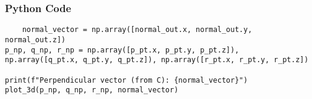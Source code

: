 \documentclass{beamer}
\begin{document}
    \begin{frame}[fragile]
        \frametitle{Python Code}
        \begin{lstlisting}
    normal_vector = np.array([normal_out.x, normal_out.y, normal_out.z])
p_np, q_np, r_np = np.array([p_pt.x, p_pt.y, p_pt.z]), np.array([q_pt.x, q_pt.y, q_pt.z]), np.array([r_pt.x, r_pt.y, r_pt.z])

print(f"Perpendicular vector (from C): {normal_vector}")
plot_3d(p_np, q_np, r_np, normal_vector)

   
        \end{lstlisting}
    \end{frame}

    
    
    
\end{document}
